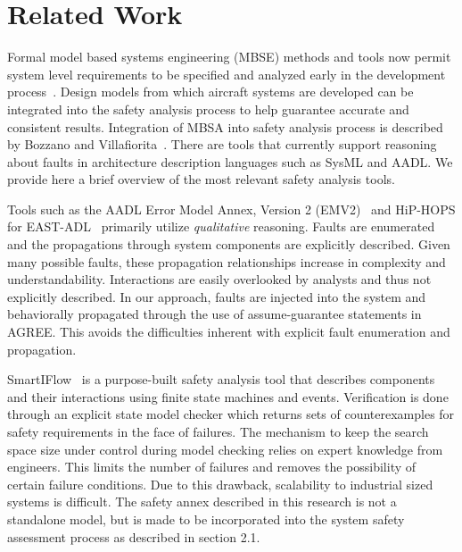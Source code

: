\section{Related Work}
\label{sec:related_work}

Formal model based systems engineering (MBSE) methods and tools now permit system level requirements to be specified and analyzed early in the development process~\cite{QFCS15:backes,CIMATTI2015333, NFM2012:CoGaMiWhLaLu, hilt2013:MuWhRaHe}. Design models from which aircraft systems are developed can be integrated into the safety analysis process to help guarantee accurate and consistent results. Integration of MBSA into safety analysis process is described by Bozzano and Villafiorita~\cite{Bozzano:2010:DSA:1951720}. There are tools that currently support reasoning about faults in architecture description languages such as SysML and AADL. We provide here a brief overview of the most relevant safety analysis tools. 

Tools such as the AADL Error Model Annex, Version 2 (EMV2)~\cite{EMV2} and HiP-HOPS for EAST-ADL~\cite{CHEN201391} primarily utilize \textit{qualitative} reasoning. Faults are enumerated and the propagations through system components are explicitly described. Given many possible faults, these propagation relationships increase in complexity and understandability. Interactions are easily overlooked by analysts and thus not explicitly described. In our approach, faults are injected into the system and behaviorally propagated through the use of assume-guarantee statements in AGREE. This avoids the difficulties inherent with explicit fault enumeration and propagation. 


SmartIFlow~\cite{info8010007} is a purpose-built safety analysis tool that describes components and their interactions using finite state machines and events. Verification is done through an explicit state model checker which returns sets of counterexamples for safety requirements in the face of failures. The mechanism to keep the search space size under control during model checking relies on expert knowledge from engineers. This limits the number of failures and removes the possibility of certain failure conditions. Due to this drawback, scalability to industrial sized systems is difficult. The safety annex described in this research is not a standalone model, but is made to be incorporated into the system safety assessment process as described in section 2.1. 

